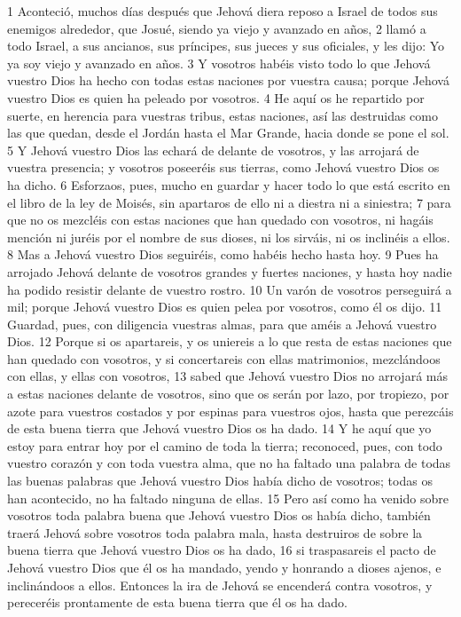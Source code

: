1 Aconteció, muchos días después que Jehová diera reposo a Israel de todos sus enemigos alrededor, que Josué, siendo ya viejo y avanzado en años,
2 llamó a todo Israel, a sus ancianos, sus príncipes, sus jueces y sus oficiales, y les dijo: Yo ya soy viejo y avanzado en años.
3 Y vosotros habéis visto todo lo que Jehová vuestro Dios ha hecho con todas estas naciones por vuestra causa; porque Jehová vuestro Dios es quien ha peleado por vosotros.
4 He aquí os he repartido por suerte, en herencia para vuestras tribus, estas naciones, así las destruidas como las que quedan, desde el Jordán hasta el Mar Grande, hacia donde se pone el sol.
5 Y Jehová vuestro Dios las echará de delante de vosotros, y las arrojará de vuestra presencia; y vosotros poseeréis sus tierras, como Jehová vuestro Dios os ha dicho.
6 Esforzaos, pues, mucho en guardar y hacer todo lo que está escrito en el libro de la ley de Moisés, sin apartaros de ello ni a diestra ni a siniestra;
7 para que no os mezcléis con estas naciones que han quedado con vosotros, ni hagáis mención ni juréis por el nombre de sus dioses, ni los sirváis, ni os inclinéis a ellos.
8 Mas a Jehová vuestro Dios seguiréis, como habéis hecho hasta hoy.
9 Pues ha arrojado Jehová delante de vosotros grandes y fuertes naciones, y hasta hoy nadie ha podido resistir delante de vuestro rostro.
10 Un varón de vosotros perseguirá a mil; porque Jehová vuestro Dios es quien pelea por vosotros, como él os dijo. 
11 Guardad, pues, con diligencia vuestras almas, para que améis a Jehová vuestro Dios.
12 Porque si os apartareis, y os uniereis a lo que resta de estas naciones que han quedado con vosotros, y si concertareis con ellas matrimonios, mezclándoos con ellas, y ellas con vosotros,
13 sabed que Jehová vuestro Dios no arrojará más a estas naciones delante de vosotros, sino que os serán por lazo, por tropiezo, por azote para vuestros costados y por espinas para vuestros ojos, hasta que perezcáis de esta buena tierra que Jehová vuestro Dios os ha dado.
14 Y he aquí que yo estoy para entrar hoy por el camino de toda la tierra; reconoced, pues, con todo vuestro corazón y con toda vuestra alma, que no ha faltado una palabra de todas las buenas palabras que Jehová vuestro Dios había dicho de vosotros; todas os han acontecido, no ha faltado ninguna de ellas.
15 Pero así como ha venido sobre vosotros toda palabra buena que Jehová vuestro Dios os había dicho, también traerá Jehová sobre vosotros toda palabra mala, hasta destruiros de sobre la buena tierra que Jehová vuestro Dios os ha dado,
16 si traspasareis el pacto de Jehová vuestro Dios que él os ha mandado, yendo y honrando a dioses ajenos, e inclinándoos a ellos. Entonces la ira de Jehová se encenderá contra vosotros, y pereceréis prontamente de esta buena tierra que él os ha dado.

